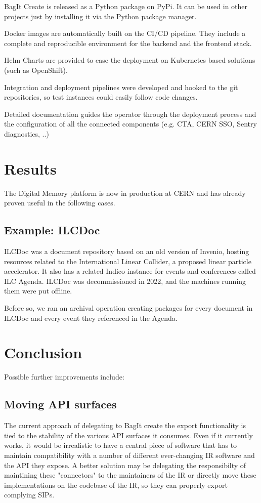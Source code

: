 \documentclass[11pt]{IEEEtran}
\begin{document}
BagIt Create is released as a Python package on PyPi. It can be used in other projects just by installing it via the Python package manager.

Docker images are automatically built on the CI/CD pipeline. They include a complete and reproducible environment for the backend and the frontend stack.

Helm Charts are provided to ease the deployment on Kubernetes based solutions (such as OpenShift).


Integration and deployment pipelines were developed and hooked to the git repositories, so test instances could easily follow code changes.

Detailed documentation guides the operator through the deployment process and the configuration of all the connected components (e.g. CTA, CERN SSO, Sentry diagnostics, ..)


\section{Results}

The Digital Memory platform is now in production at CERN and has already proven useful in the following cases. 

\subsection{Example: ILCDoc}

ILCDoc was a document repository based on an old version of Invenio, hosting resources related to the International Linear Collider, a proposed linear particle accelerator. It also has a related Indico instance for events and conferences called ILC Agenda.
ILCDoc was decommissioned in 2022, and the machines running them were put offline.

Before so, we ran an archival operation creating packages for every document in ILCDoc and every event they referenced in the Agenda.





\section{Conclusion}

Possible further improvements include:

\subsection{Moving API surfaces}
The current approach of delegating to BagIt create the export functionality is tied to the stability of the various API surfaces it consumes. Even if it currently works, it would be irrealistic to have a central piece of software that has to maintain compatibility with a number of different ever-changing IR software and the API they expose. A better solution may be delegating the responsibilty of maintining these "connectors" to the maintainers of the IR or directly move these implementations on the codebase of the IR, so they can properly export complying SIPs.
\end{document}
